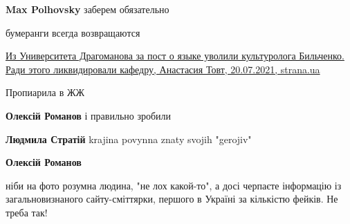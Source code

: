 \begin{itemize}
\begin{itemize}
\textbf{Max Polhovsky} заберем обязательно
\end{itemize}

 
бумеранги всегда возвращаются

 

\href{https://strana.ua/news/344771-poetessu-bilchenko-uvolili-iz-universiteta-drahomanova-za-post-o-jazyke.html}{%
Из Университета Драгоманова за пост о языке уволили культуролога Бильченко. Ради этого ликвидировали кафедру,%
Анастасия Товт, 20.07.2021, strana.ua%
}

\begin{itemize}
 
Пропиарила в ЖЖ

 
\textbf{Олексій Романов} і правильно зробили

 
\textbf{Людмила Стратій} krajina povynna znaty svojih "gerojiv"

 
\textbf{Олексій Романов} 

ніби на фото розумна людина, "не лох какой-то", а досі черпаєте інформацію із
загальновизнаного сайту-сміттярки, першого в Україні за кількістю фейків. Не
треба так!
\end{itemize}


\end{itemize}
